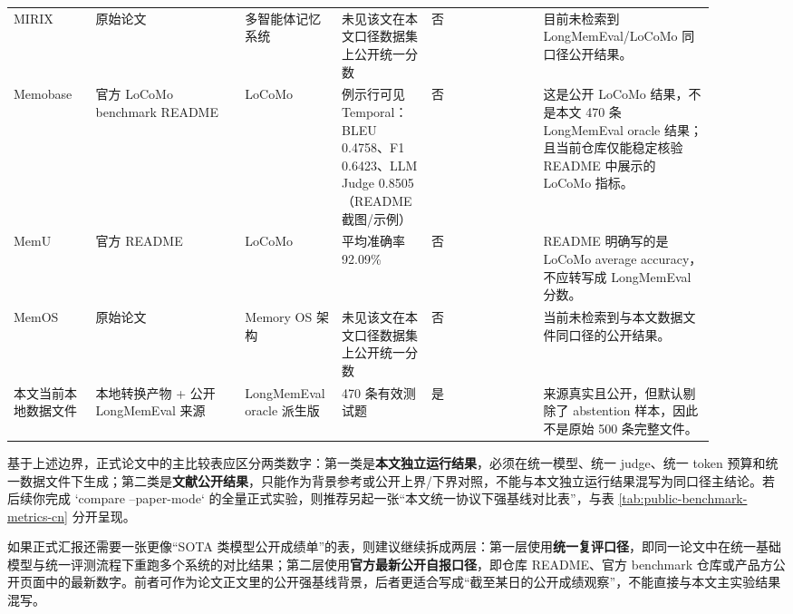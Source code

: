 \documentclass[a4paper,fleqn]{cas-sc}
\begin{document}
\begin{CJK*}{UTF8}{gbsn}
\begin{table}[t]
\begin{tabular}{P{0.11\linewidth}P{0.20\linewidth}P{0.09\linewidth}P{0.12\linewidth}P{0.15\linewidth}P{0.23\linewidth}}
MIRIX & 原始论文 & 多智能体记忆系统 & 未见该文在本文口径数据集上公开统一分数 & 否 & 目前未检索到 LongMemEval/LoCoMo 同口径公开结果。 \\
Memobase & 官方 LoCoMo benchmark README & LoCoMo & 例示行可见 Temporal：BLEU 0.4758、F1 0.6423、LLM Judge 0.8505（README 截图/示例） & 否 & 这是公开 LoCoMo 结果，不是本文 470 条 LongMemEval oracle 结果；且当前仓库仅能稳定核验 README 中展示的 LoCoMo 指标。 \\
MemU & 官方 README & LoCoMo & 平均准确率 92.09\% & 否 & README 明确写的是 LoCoMo average accuracy，不应转写成 LongMemEval 分数。 \\
MemOS & 原始论文 & Memory OS 架构 & 未见该文在本文口径数据集上公开统一分数 & 否 & 当前未检索到与本文数据文件同口径的公开结果。 \\
本文当前本地数据文件 & 本地转换产物 + 公开 LongMemEval 来源 & LongMemEval oracle 派生版 & 470 条有效测试题 & 是 & 来源真实且公开，但默认剔除了 abstention 样本，因此不是原始 500 条完整文件。 \\
\bottomrule
\end{tabular}
\end{table}

基于上述边界，正式论文中的主比较表应区分两类数字：第一类是\textbf{本文独立运行结果}，必须在统一模型、统一 judge、统一 token 预算和统一数据文件下生成；第二类是\textbf{文献公开结果}，只能作为背景参考或公开上界/下界对照，不能与本文独立运行结果混写为同口径主结论。若后续你完成 `compare --paper-mode` 的全量正式实验，则推荐另起一张“本文统一协议下强基线对比表”，与表 \ref{tab:public-benchmark-metrics-cn} 分开呈现。

如果正式汇报还需要一张更像“SOTA 类模型公开成绩单”的表，则建议继续拆成两层：第一层使用\textbf{统一复评口径}，即同一论文中在统一基础模型与统一评测流程下重跑多个系统的对比结果；第二层使用\textbf{官方最新公开自报口径}，即仓库 README、官方 benchmark 仓库或产品方公开页面中的最新数字。前者可作为论文正文里的公开强基线背景，后者更适合写成“截至某日的公开成绩观察”，不能直接与本文主实验结果混写。


\end{CJK*}
\end{document}
